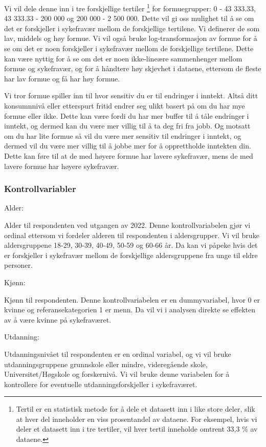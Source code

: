 \documentclass[
  12pt,
  a4paper,
  DIV=11,
  numbers=noendperiod]{scrartcl}
\begin{document}
Vi vil dele denne inn i tre forskjellige tertiler \footnote{Tertil er en
  statistisk metode for å dele et datasett inn i like store deler, slik
  at hver del inneholder en viss prosentandel av dataene. For eksempel,
  hvis vi deler et datasett inn i tre tertiler, vil hver tertil
  inneholde omtrent 33,3 \% av dataene.} for formuegrupper: 0 - 43
333.33, 43 333.33 - 200 000 og 200 000 - 2 500 000. Dette vil gi oss
mulighet til å se om det er forskjeller i sykefravær mellom de
forskjellige tertilene. Vi definerer de som lav, middels og høy formue.
Vi vil også bruke log-transformasjon av formue for å se om det er noen
forskjeller i sykefravær mellom de forskjellige tertilene. Dette kan
være nyttig for å se om det er noen ikke-lineære sammenhenger mellom
formue og sykefravær, og for å håndtere høy skjevhet i dataene, ettersom
de fleste har lav formue og få har høy formue.

Vi tror formue spiller inn til hvor sensitiv du er til endringer i
inntekt. Altså ditt konsumnnivå eller etterspurt fritid endrer seg ulikt
basert på om du har mye formue eller ikke. Dette kan være fordi du har
mer buffer til å tåle endringer i inntekt, og dermed kan du være mer
villig til å ta deg fri fra jobb. Og motsatt om du har lite formue så
vil du være mer sensitiv til endringer i inntekt, og dermed vil du være
mer villig til å jobbe mer for å opprettholde inntekten din. Dette kan
føre til at de med høyere formue har lavere sykefravær, mens de med
lavere formue har høyere sykefravær.

\subsubsection{Kontrollvariabler}\label{kontrollvariabler}

Alder:

Alder til respondenten ved utgangen av 2022. Denne kontrollvariabelen
gjør vi ordinal ettersom vi fordeler alderen til respondenten i
aldersgrupper. Vi vil bruke aldersgruppene 18-29, 30-39, 40-49, 50-59 og
60-66 år. Da kan vi påpeke hvis det er forskjeller i sykefravær mellom
de forskjellige aldersgruppene fra unge til eldre personer.

Kjønn:

Kjønn til respondenten. Denne kontrollvariabelen er en dummyvariabel,
hvor 0 er kvinne og referansekategorien 1 er menn. Da vil vi i analysen
direkte se effekten av å være kvinne på sykefraværet.

Utdanning:

Utdanningsnivået til respondenten er en ordinal variabel, og vi vil
bruke utdanningsgruppene grunnskole eller mindre, videregående skole,
Universitet/Høgskole og forskernivå. Vi vil bruke denne variabelen for å
kontrollere for eventuelle utdanningsforskjeller i sykefraværet.
\end{document}
